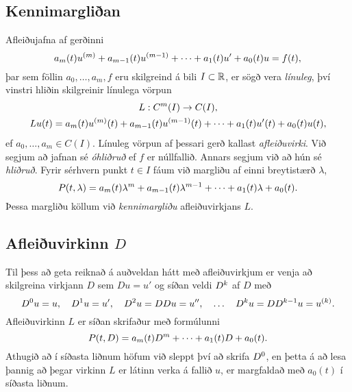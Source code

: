 \subsection*{Kennimargliðan}

Afleiðujafna af gerðinni
 $$a_m(t)u\sp{(m)}+a_{m-1}(t)u\sp{(m-1)}+\cdots+a_1(t)u'+a_0(t)u=f(t),
 $$
þar sem föllin $a_0,\dots,a_m,f$ eru skilgreind á bili $I\subset {\mathbb R}$,
er sögð vera {\it línuleg}, því vinstri
hliðin skilgreinir línulega vörpun
\begin{gather*}
L:C\sp m(I)\to C(I),\\
Lu(t)=
a_m(t)u\sp{(m)}(t)+a_{m-1}(t)u\sp{(m-1)}(t)+
\cdots+a_1(t)u'(t)+a_0(t)u(t),
\end{gather*}
ef $a_0,\dots,a_m\in C(I)$.
Línuleg vörpun af þessari gerð  kallast {\it
afleiðuvirki}.  
Við segjum að jafnan sé {\it
óhliðruð} ef $f$ er núllfallið.
Annars segjum við að hún sé {\it
hliðruð}.
Fyrir sérhvern punkt $t\in I$ fáum við margliðu af einni breytistærð
$\lambda$,
 \begin{equation*}
P(t,\lambda)= a_m(t)\lambda\sp{m}+a_{m-1}(t)\lambda\sp{m-1}+
\cdots+a_1(t)\lambda+a_0(t).\label{2.1.1}
 \end{equation*}
Þessa margliðu köllum við {\it
kennimargliðu
} afleiðuvirkjans $L$.


\subsection*{Afleiðuvirkinn $D$}

Til þess að geta reiknað á auðveldan hátt með afleiðuvirkjum er venja að
skilgreina virkjann $D$ sem $Du=u'$ og síðan veldi $D\sp k$ af $D$ með
$$
D\sp 0u=u, \quad D\sp 1u=u', \quad
D\sp 2u=DDu=u{\sp{\prime\prime}}, \quad \dots \quad D\sp ku= D D\sp
{k-1}u=u\sp{(k)}. 
$$
Afleiðuvirkinn $L$ er síðan  skrifaður með formúlunni
 \begin{equation*}P(t,D)=a_m(t)D\sp m+\cdots+a_1(t)D+a_0(t).\label{2.1.2}
 \end{equation*}
Athugið að í síðasta liðnum höfum við sleppt því að skrifa $D\sp 0$,
en þetta á að lesa þannig að þegar virkinn $L$ er látinn verka á fallið $u$,
er margfaldað með $a_0(t)$ í síðasta liðnum.  

